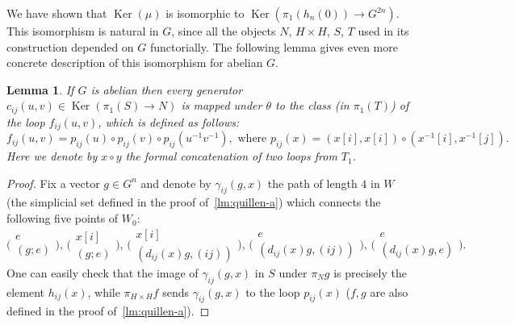 \documentclass[oneside, 10pt]{amsart}
\theoremstyle{plain}
\numberwithin{equation}{section}
\newtheorem{lemma}{Lemma}
\numberwithin{lemma}{section}
\theoremstyle{remark}
\theoremstyle{definition}
\DeclareMathOperator{\Ker}{Ker}
\begin{document}
We have shown that $\Ker(\mu)$ is isomorphic to $\Ker(\pi_1(h_n(0)) \to G^{2n})$.
This isomorphism is natural in $G$, since all the objects $N$, $H\times H$, $S$, $T$ used in its construction depended on $G$ functorially.
The following lemma gives even more concrete description of this isomorphism for abelian $G$.
\begin{lemma} \label{lem:concrete-formula}
 If $G$ is abelian then every generator $c_{ij}(u, v) \in \Ker(\pi_1(S)\to N)$ is mapped under $\theta$ to the class (in $\pi_1(T)$) of the loop $f_{ij}(u, v)$, 
  which is defined as follows:
 \[f_{ij}(u,v) = p_{ij}(u) \circ p_{ij}(v) \circ p_{ij}(u^{-1} v^{-1}), \text{ where }
   p_{ij}(x)=(x[i], x[i]) \circ (x^{-1}[i], x^{-1}[j]).\]
 Here we denote by $x \circ y$ the formal concatenation of two loops from $T_1$.
\end{lemma}
\begin{proof}
Fix a vector $g\in G^n$ and denote by $\gamma_{ij}(g, x)$ the path of length $4$ in $W$ (the simplicial set defined in the proof of~\cref{lm:quillen-a}) which connects 
the following five points of $W_0$:
\[
\Big(\begin{smallmatrix} e    \\ (g; e) \end{smallmatrix}\Big),\,
\Big(\begin{smallmatrix} x[i] \\ (g; e) \end{smallmatrix}\Big),\,
\Big(\begin{smallmatrix} x[i] \\ (d_{ij}(x) g, (ij)) \end{smallmatrix}\Big),\,
\Big(\begin{smallmatrix} e    \\ (d_{ij}(x) g, (ij)) \end{smallmatrix}\Big),\,
\Big(\begin{smallmatrix} e    \\ (d_{ij}(x) g, e) \end{smallmatrix}\Big).\]
One can easily check that the image of $\gamma_{ij}(g, x)$ in $S$ under $\pi_N g$ is precisely the element $h_{ij}(x)$, while
$\pi_{H\times H} f$ sends $\gamma_{ij}(g, x)$ to the loop $p_{ij}(x)$ ($f, g$ are also defined in the proof of~\cref{lm:quillen-a}).
\end{proof}
\end{document}
